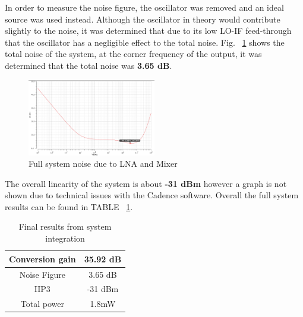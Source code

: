 In order to measure the noise figure, the oscillator was removed and an ideal source was used instead. Although the oscillator in theory would contribute slightly to the noise, it was determined that due to its low LO-IF feed-through that the oscillator has a negligible effect to the total noise. Fig. ~\ref{fig:fullsystemnoise} shows the total noise of the system, at the corner frequency of the output, it was determined that the total noise was {\bf 3.65 dB}.

\begin{figure}[h]
   \centering
    \includegraphics[width=0.5\textwidth]{figures/FullSysNoiseFigure.png}
    \caption{Full system noise due to LNA and Mixer}
    \label{fig:fullsystemnoise}
\end{figure}

The overall linearity of the system is about {\bf -31 dBm} however a graph is not shown due to technical issues with the Cadence software. Overall the full system results can be found in TABLE ~\ref{tab:systemresults}.


\begin{table}[h]
\begin{center}
	\begin{tabular}{ |c | c | }
 		\hline                      
  		Conversion gain & 35.92 dB \\ \hline
  		Noise Figure & 3.65 dB \\ \hline
  		IIP3 & -31 dBm\\ \hline
		Total power & 1.8mW \\
  		\hline  
	\end{tabular}

\end{center}
\caption{Final results from system integration}
\label{tab:systemresults}
\end{table}
